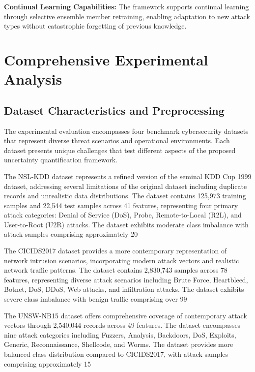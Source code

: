 \documentclass[journal]{IEEEtran}
\begin{document}
\textbf{Continual Learning Capabilities:} The framework supports continual learning through selective ensemble member retraining, enabling adaptation to new attack types without catastrophic forgetting of previous knowledge.

\section{Comprehensive Experimental Analysis}

\subsection{Dataset Characteristics and Preprocessing}

The experimental evaluation encompasses four benchmark cybersecurity datasets that represent diverse threat scenarios and operational environments. Each dataset presents unique challenges that test different aspects of the proposed uncertainty quantification framework.

The NSL-KDD dataset represents a refined version of the seminal KDD Cup 1999 dataset, addressing several limitations of the original dataset including duplicate records and unrealistic data distributions. The dataset contains 125,973 training samples and 22,544 test samples across 41 features, representing four primary attack categories: Denial of Service (DoS), Probe, Remote-to-Local (R2L), and User-to-Root (U2R) attacks. The dataset exhibits moderate class imbalance with attack samples comprising approximately 20%

The CICIDS2017 dataset provides a more contemporary representation of network intrusion scenarios, incorporating modern attack vectors and realistic network traffic patterns. The dataset contains 2,830,743 samples across 78 features, representing diverse attack scenarios including Brute Force, Heartbleed, Botnet, DoS, DDoS, Web attacks, and infiltration attacks. The dataset exhibits severe class imbalance with benign traffic comprising over 99%

The UNSW-NB15 dataset offers comprehensive coverage of contemporary attack vectors through 2,540,044 records across 49 features. The dataset encompasses nine attack categories including Fuzzers, Analysis, Backdoors, DoS, Exploits, Generic, Reconnaissance, Shellcode, and Worms. The dataset provides more balanced class distribution compared to CICIDS2017, with attack samples comprising approximately 15%
\end{document}
